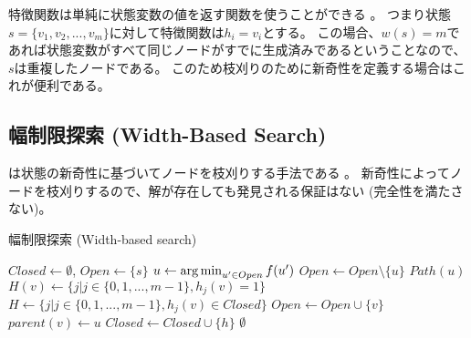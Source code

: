 特徴関数は単純に状態変数の値を返す関数を使うことができる \cite{geffner2015, lipovetzky2015a}。
つまり状態$s = \{v_1, v_2,...,v_m\}$に対して特徴関数は$h_i = v_i$とする。
この場合、$w(s) = m$であれば状態変数がすべて同じノードがすでに生成済みであるということなので、$s$は重複したノードである。
このため枝刈りのために新奇性を定義する場合はこれが便利である。



\subsection{幅制限探索 (Width-Based Search)}
\label{sec:width-based-search}

は状態の新奇性に基づいてノードを枝刈りする手法である \cite{lipovetzkyg12}。
新奇性によってノードを枝刈りするので、解が存在しても発見される保証はない (完全性を満たさない)。

\begin{algorithm}[tbh]
\caption{幅制限探索 (Width-based search)}
\label{alg:width-based-search}
	$Closed \leftarrow \emptyset$, $Open \leftarrow \{s\}$\;
	 {
                $u \leftarrow \operatorname*{arg\,min}_{u' \in Open} f(u')$ \;
		$Open \leftarrow Open \setminus \{u\} $\;
		 {
			\Return $Path(u)$\;
		}
		 {
                  $H(v) \leftarrow \{j | j \in \{0, 1, ..., m-1\}, h_j(v) = 1\}$\;
                  $H \leftarrow \{j | j \in \{0, 1, ..., m-1\}, h_j(v) \in Closed\}$\;
                   {
                    $Open \leftarrow Open \cup \{v\}$\;
                    $parent(v) \leftarrow u$\;
                  }
                   {
                    $Closed \leftarrow Closed \cup \{h\}$\;
                  }
		}
 	}
	\Return $\emptyset$\;
\end{algorithm}

